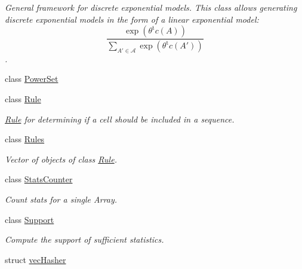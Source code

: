 \begin{DoxyCompactItemize}
\begin{DoxyCompactList}\small\item\em General framework for discrete exponential models. This class allows generating discrete exponential models in the form of a linear exponential model\+: \[ \frac{ \exp{\left(\theta^{\mbox{t}}c(A)\right)} }{ \sum_{A'\in \mathcal{A}}\exp{\left(\theta^{\mbox{t}}c(A')\right)} } \]. \end{DoxyCompactList}\item 
class \hyperlink{classbarry_1_1_power_set}{Power\+Set}
\item 
class \hyperlink{classbarry_1_1_rule}{Rule}
\begin{DoxyCompactList}\small\item\em \hyperlink{classbarry_1_1_rule}{Rule} for determining if a cell should be included in a sequence. \end{DoxyCompactList}\item 
class \hyperlink{classbarry_1_1_rules}{Rules}
\begin{DoxyCompactList}\small\item\em Vector of objects of class \hyperlink{classbarry_1_1_rule}{Rule}. \end{DoxyCompactList}\item 
class \hyperlink{classbarry_1_1_stats_counter}{Stats\+Counter}
\begin{DoxyCompactList}\small\item\em Count stats for a single Array. \end{DoxyCompactList}\item 
class \hyperlink{classbarry_1_1_support}{Support}
\begin{DoxyCompactList}\small\item\em Compute the support of sufficient statistics. \end{DoxyCompactList}\item 
struct \hyperlink{structbarry_1_1vec_hasher}{vec\+Hasher}
\end{DoxyCompactItemize}
